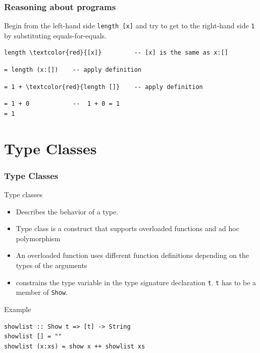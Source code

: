 \documentclass{beamer}
\begin{document}
\begin{frame}[fragile]
  \frametitle{Reasoning about programs}
Begin from the left-hand side \verb|length [x]| and try to get to the right-hand side \verb|1| by substituting equals-for-equals.
\begin{Verbatim}[commandchars=\\\{\}]
length \textcolor{red}{[x]}         -- [x] is the same as x:[]
\end{Verbatim}
\pause
\begin{verbatim}
= length (x:[])    -- apply definition
\end{verbatim}
\pause
\begin{Verbatim}[commandchars=\\\{\}]
= 1 + \textcolor{red}{length []}    -- apply definition
\end{Verbatim}
\pause
\begin{verbatim}
= 1 + 0            --  1 + 0 = 1
= 1
\end{verbatim}
\end{frame}

\section{Type Classes}

\begin{frame}[fragile]
\frametitle{Type Classes}
  \begin{block}{Type classes}
    \begin{itemize}
   \item Describes the behavior of a type.
    \item  Type class is a construct that supports overloaded functions and ad hoc polymorphism
  \item An overloaded function uses different function definitions depending on the types of the arguments
  \item constrains the type variable in the type signature declaration \verb|t|. \verb|t| has to be a member of \verb|Show|.
  \end{itemize}
\end{block}
\begin{block}{Example}
\begin{Verbatim}
showlist :: Show t => [t] -> String
showlist [] = ""
showlist (x:xs) = show x ++ showlist xs
\end{Verbatim}

\end{block}
\end{frame}
\end{document}
